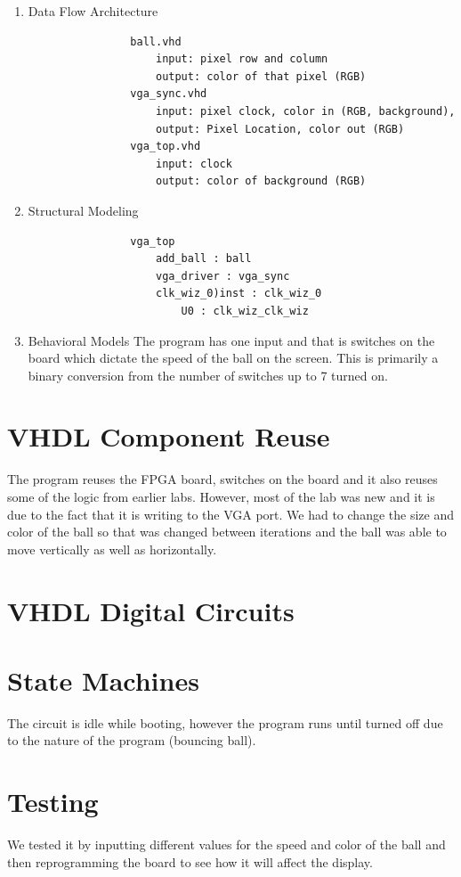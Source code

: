     \begin{enumerate}
        \item Data Flow Architecture
            \begin{verbatim}
                ball.vhd
                    input: pixel row and column
                    output: color of that pixel (RGB)
                vga_sync.vhd
                    input: pixel clock, color in (RGB, background),
                    output: Pixel Location, color out (RGB)
                vga_top.vhd
                    input: clock
                    output: color of background (RGB)
            \end{verbatim}
        \item Structural Modeling
            \begin{verbatim}
                vga_top 
                    add_ball : ball
                    vga_driver : vga_sync
                    clk_wiz_0)inst : clk_wiz_0
                        U0 : clk_wiz_clk_wiz
            \end{verbatim}
        \item Behavioral Models
            The program has one input and that is switches on the board which dictate the speed of the ball on the screen. This is primarily a binary conversion from the number of switches up to 7 turned on. 
     \end{enumerate}

 \section{VHDL Component Reuse}
    The program reuses the FPGA board, switches on the board and it also reuses some of the logic from earlier labs. However, most of the lab was new and it is due to the fact that it is writing to the VGA port. We had to change the size and color of the ball so that was changed between iterations and the ball was able to move vertically as well as horizontally. 
 \section{VHDL Digital Circuits}
    
 \section{State Machines}
    The circuit is idle while booting, however the program runs until turned off due to the nature of the program (bouncing ball). 
 \section{Testing}
    We tested it by inputting different values for the speed and color of the ball and then reprogramming the board to see how it will affect the display. 
